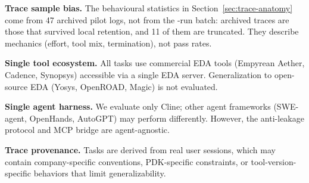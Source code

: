 \textbf{Trace sample bias.} The behavioural statistics in Section~\ref{sec:trace-anatomy} come from 47 archived pilot logs, not from the \Neval{}-run batch: archived traces are those that survived local retention, and 11 of them are truncated. They describe mechanics (effort, tool mix, termination), not pass rates.

\textbf{Single tool ecosystem.} All tasks use commercial EDA tools (Empyrean Aether, Cadence, Synopsys) accessible via a single EDA server. Generalization to open-source EDA (Yosys, OpenROAD, Magic) is not evaluated.

\textbf{Single agent harness.} We evaluate only Cline; other agent frameworks (SWE-agent, OpenHands, AutoGPT) may perform differently. However, the anti-leakage protocol and MCP bridge are agent-agnostic.

\textbf{Trace provenance.} Tasks are derived from real user sessions, which may contain company-specific conventions, PDK-specific constraints, or tool-version-specific behaviors that limit generalizability.
